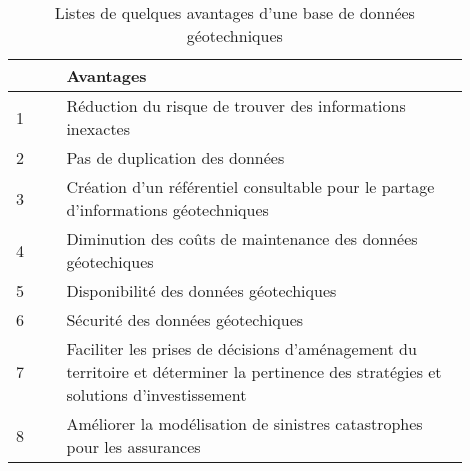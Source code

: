 \par    
\begin{table}
        \centering
        \begin{tabular}{|p{0.10\linewidth}|p{0.80\linewidth}|}
        \hline
                \textbf{ } & \textbf{Avantages} \\
                \hline
                    1 &
                    Réduction du risque de trouver des informations inexactes
                    \\
                \hline 
                    2 &
                    Pas de duplication des données
                    \\
                \hline 
                    3 &
                    Création d'un référentiel consultable pour le partage d’informations géotechniques
                    \\
                \hline 
                    4 &
                    Diminution des coûts de maintenance des données géotechiques
                    \\
                \hline 
                    5 &
                    Disponibilité des données géotechiques
                    \\
                \hline 
                    6 &
                    Sécurité des données géotechiques
                    \\
                \hline 
                    7 &
                    Faciliter les prises de décisions d’aménagement du territoire 
                    et déterminer la pertinence des stratégies et solutions d’investissement
                    \\
                \hline 
                    8 &
                    Améliorer la modélisation de sinistres catastrophes pour les assurances
                    \\
            \hline 
        \end{tabular}
        \caption{Listes de quelques avantages d'une base de données géotechniques} \label{tab:avantages}
\end{table}
\par
